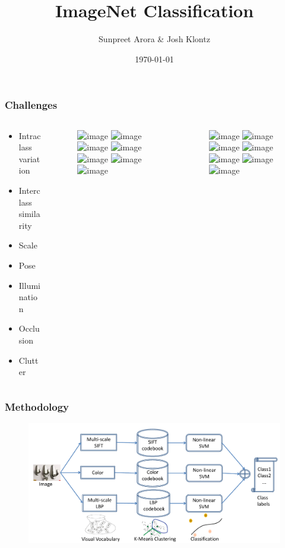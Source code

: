 \documentclass{beamer}
\title[ImageNet]{ImageNet Classification}
\author{Sunpreet Arora \& Josh Klontz}
\date{\today}
\begin{document}
%
\graphicspath{{images/}}

\begin{frame}
\titlepage
\end{frame}
%
\begin{frame}
\frametitle{Challenges}
\begin{columns}
\begin{column}{.3\textwidth}
\begin{itemize}
\item<1-7> Intraclass variation
\item<2-7> Interclass similarity
\item<3-7> Scale
\item<4-7> Pose
\item<5-7> Illumination
\item<6-7> Occlusion
\item<7> Clutter
\end{itemize}
\end{column}
\begin{column}{.3\textwidth}
\begin{figure}
\includegraphics<1>[width=\textwidth]{chime1}
\includegraphics<2>[width=\textwidth]{spatula1}
\includegraphics<3>[width=\textwidth]{canoe1}
\includegraphics<4>[width=\textwidth]{hatchet1}
\includegraphics<5>[width=\textwidth]{cleaver2}
\includegraphics<6>[width=\textwidth]{pdrill1}
\includegraphics<7>[width=\textwidth]{cleaver1}
\end{figure}
\end{column}
\begin{column}{.3\textwidth}
\begin{figure}
\includegraphics<1>[width=\textwidth]{chime2}
\includegraphics<2>[width=\textwidth]{ladle1}
\includegraphics<3>[width=\textwidth]{canoe2}
\includegraphics<4>[width=\textwidth]{hatchet2}
\includegraphics<5>[width=\textwidth]{cleaver3}
\includegraphics<6>[width=\textwidth]{spatula2}
\includegraphics<7>[width=\textwidth]{spatula3}
\end{figure}
\end{column}
\end{columns}
\end{frame}

\begin{frame}
\frametitle{Methodology}
\begin{figure}
\includegraphics[width=1\textwidth]{flowchart}
\end{figure}
\end{frame}
\end{document}
